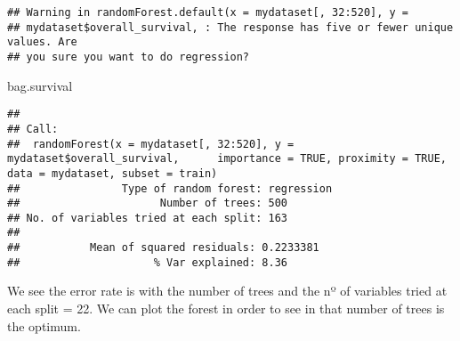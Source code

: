 \documentclass[
]{article}
\newenvironment{Shaded}{\begin{snugshade}}{\end{snugshade}}
\newcommand{\CommentTok}[1]{\textcolor[rgb]{0.56,0.35,0.01}{\textit{#1}}}
\newcommand{\DataTypeTok}[1]{\textcolor[rgb]{0.13,0.29,0.53}{#1}}
\newcommand{\DecValTok}[1]{\textcolor[rgb]{0.00,0.00,0.81}{#1}}
\newcommand{\KeywordTok}[1]{\textcolor[rgb]{0.13,0.29,0.53}{\textbf{#1}}}
\newcommand{\NormalTok}[1]{#1}
\newcommand{\OperatorTok}[1]{\textcolor[rgb]{0.81,0.36,0.00}{\textbf{#1}}}
\newcommand{\StringTok}[1]{\textcolor[rgb]{0.31,0.60,0.02}{#1}}
\begin{document}
\begin{verbatim}
## Warning in randomForest.default(x = mydataset[, 32:520], y =
## mydataset$overall_survival, : The response has five or fewer unique values. Are
## you sure you want to do regression?
\end{verbatim}

\begin{Shaded}
\begin{Highlighting}[]
\NormalTok{bag.survival}
\end{Highlighting}
\end{Shaded}

\begin{verbatim}
## 
## Call:
##  randomForest(x = mydataset[, 32:520], y = mydataset$overall_survival,      importance = TRUE, proximity = TRUE, data = mydataset, subset = train) 
##                Type of random forest: regression
##                      Number of trees: 500
## No. of variables tried at each split: 163
## 
##           Mean of squared residuals: 0.2233381
##                     % Var explained: 8.36
\end{verbatim}

\begin{Shaded}
\end{Shaded}

We see the error rate is with the number of trees and the nº of
variables tried at each split = 22. We can plot the forest in order to
see in that number of trees is the optimum.

\begin{Shaded}
\end{Shaded}
\end{document}
